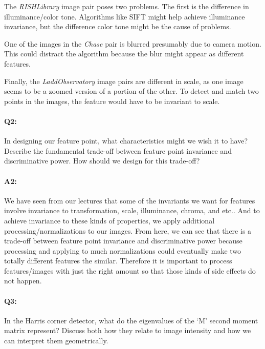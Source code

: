 The \emph{RISHLibrary} image pair poses two problems. The first is the difference in illuminance/color tone. Algorithms like SIFT might help achieve illuminance invariance, but the difference color tone might be the cause of problems.

One of the images in the \emph{Chase} pair is blurred presumably due to camera motion. This could distract the algorithm because the blur might appear as different features.

Finally, the \emph{LaddObservatory} image pairs are different in scale, as one image seems to be a zoomed version of a portion of the other. To detect and match two points in the images, the feature would have to be invariant to scale.


\pagebreak
\paragraph{Q2:} In designing our feature point, what characteristics might we wish it to have? Describe the fundamental trade-off between feature point invariance and discriminative power. How should we design for this trade-off?

\paragraph{A2:}
We have seen from our lectures that some of the invariants we want for features involve invariance to transformation, scale, illuminance, chroma, and etc.. And to achieve invariance to these kinds of properties, we apply additional processing/normalizations to our images. From here, we can see that there is a trade-off between feature point invariance and discriminative power because processing and applying to much normalizations could eventually make two totally different features the similar. Therefore it is important to process features/images with just the right amount so that those kinds of side effects do not happen.


\pagebreak
\paragraph{Q3:} In the Harris corner detector, what do the eigenvalues of the `M' second moment matrix represent? Discuss both how they relate to image intensity and how we can interpret them geometrically.

